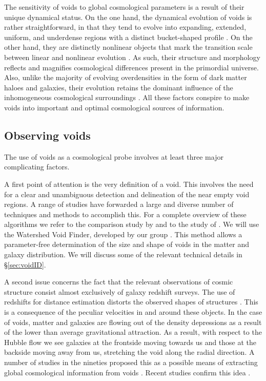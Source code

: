 The sensitivity of voids to global cosmological parameters is a result of their unique dynamical status. On the one hand, the 
dynamical evolution of voids is rather straightforward, in that they tend to evolve into expanding, extended, uniform, and 
underdense regions with a distinct bucket-shaped profile \citep{sheth04}. On the other hand, they are distinctly 
nonlinear objects that mark the transition scale between linear and nonlinear evolution \citep{sahni94}. As such, 
their structure and morphology reflects and magnifies cosmological differences present in the primordial universe. Also, unlike 
the majority of evolving overdensities in the form of dark matter haloes and galaxies, their evolution retains the dominant 
influence of the inhomogeneous cosmological surroundings \citep{platen08}. All these factors conspire to make voids into 
important and optimal cosmological sources of information.
 
\subsection{Observing voids}
\label{sec:observingvoids}
The use of voids as a cosmological probe involves at least three major complicating factors. 

A first point of attention is the very definition of a void. This involves the need for a clear and unambiguous 
detection and delineation of the near empty void regions. A range of studies have forwarded a large and diverse number of
techniques and methods to accomplish this. For a complete overview of these algorithms we refer to the comparison study by 
\citet{colberg08} and to the study of \citet{lavaux10}. We will use the Watershed Void Finder, developed by our group 
\citep{platen07}. This method allows a parameter-free determination of the size and shape of voids in the matter and 
galaxy distribution. We will discuss some of the relevant technical details in \S\ref{sec:voidID}. 

A second issue concerns the fact that the relevant observations of cosmic structure consist almost exclusively of 
galaxy redshift surveys. The use of redshifts for distance estimation distorts the observed shapes of structures \citep{shoji12}. 
This is a consequence of the peculiar velocities in and around these objects. In the case of voids, matter and galaxies are flowing 
out of the density depressions as a result of the lower than average gravitational attraction. As a result, with respect to the 
Hubble flow we see galaxies at the frontside moving towards us and those at the backside moving away from us, stretching the void 
along the radial direction. A number of studies in the nineties proposed this as a possible means of extracting global cosmological 
information from voids \citep[e.g][]{ryden96}. Recent studies confirm this idea \citep{percival09, jennings11}.

